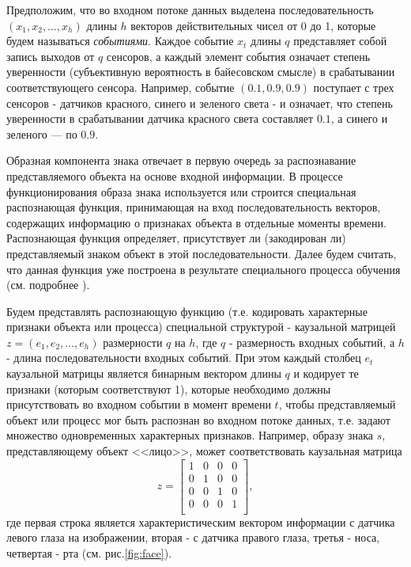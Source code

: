 \documentclass[12pt]{scrartcl}
\begin{document}
	Предположим, что во входном потоке данных выделена последовательность $(x_1,x_2,\dots,x_h)$ длины $h$ векторов действительных чисел от 0 до 1, которые будем называться \textit{событиями}. Каждое событие $x_t$ длины $q$ представляет собой запись выходов от $q$ сенсоров, а каждый элемент события означает степень уверенности (субъективную вероятность в байесовском смысле) в срабатывании соответствующего сенсора. Например, событие $(0.1, 0.9, 0.9)$ поступает с трех сенсоров - датчиков красного, синего и зеленого света - и означает, что степень уверенности в срабатывании датчика красного света составляет $0.1$, а синего и зеленого --- по $0.9$.
	
	Образная компонента знака отвечает в первую очередь за распознавание представляемого объекта на основе входной информации. В процессе функционирования образа знака используется или строится специальная распознающая функция, принимающая на вход последовательность векторов, содержащих информацию о признаках объекта в отдельные моменты времени. Распознающая функция определяет, присутствует ли (закодирован ли) представляемый знаком объект в этой последовательности. Далее будем считать, что данная функция уже построена в результате специального процесса обучения (см. подробнее \cite{Panov2014d,Skrynnik2016}).
	
	Будем представлять распознающую функцию (т.е. кодировать характерные признаки объекта или процесса) специальной структурой - каузальной матрицей $z=(e_1,e_2,\dots,e_h)$ размерности $q$ на $h$, где $q$ - размерность входных событий, а $h$ - длина последовательности входных событий. При этом каждый столбец $e_t$ каузальной матрицы является бинарным вектором длины $q$ и кодирует те признаки (которым соответствуют 1), которые необходимо должны присутствовать во входном событии в момент времени $t$, чтобы представляемый объект или процесс мог быть распознан во входном потоке данных, т.е. задают множество одновременных характерных признаков. Например, образу знака $s$, представляющему объект <<лицо>>, может соответствовать каузальная матрица 	
	\[
		z=\begin{bmatrix}
			1 & 0 & 0 & 0\\
			0 & 1 & 0 & 0\\
			0 & 0 & 1 & 0\\
			0 & 0 & 0 & 1\\
		\end{bmatrix},
	\]
	где первая строка является характеристическим вектором информации с датчика левого глаза на изображении, вторая - с датчика правого глаза, третья - носа, четвертая - рта (см. рис.\ref{fig:face}).
\end{document}
